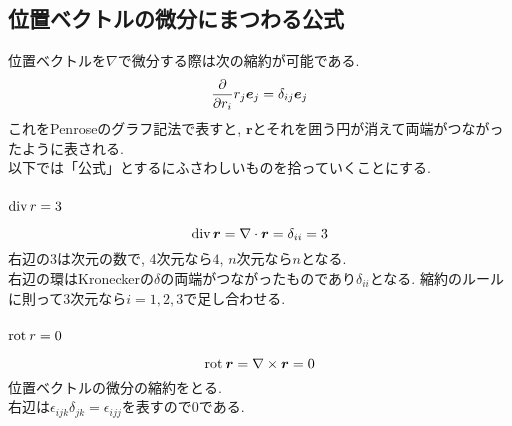 \documentclass[dvipdfmx]{jsarticle}
\begin{document}
\subsection{位置ベクトルの微分にまつわる公式}

位置ベクトルを$\nabla$で微分する際は次の縮約が可能である.
\begin{equation*}
    \pdv{r_i}r_j\bm{e}_j=\delta_{ij}\bm{e}_j
\end{equation*}
これをPenroseのグラフ記法で表すと, $\bm{r}$とそれを囲う円が消えて両端がつながったように表される.
\begin{equation*}
    
\end{equation*}
以下では「公式」とするにふさわしいものを拾っていくことにする.


\subsubsection{$\operatorname{\mathrm{div}} r=3$}

\begin{equation*}
    \operatorname{\mathrm{div}}\bm{r}=\nabla\cdot\bm{r}=\delta_{ii}=3
\end{equation*}
右辺の$3$は次元の数で, 4次元なら$4$, $n$次元なら$n$となる.
\begin{equation*}
    
\end{equation*}
右辺の環はKroneckerの$\delta$の両端がつながったものであり$\delta_{ii}$となる.
縮約のルールに則って3次元なら$i=1,2,3$で足し合わせる.


\subsubsection{$\mathrm{rot}\: r=0$}

\begin{equation*}
    \mathrm{rot}\:\bm{r}=\nabla\times\bm{r}=0
\end{equation*}
位置ベクトルの微分の縮約をとる.
\begin{equation*}
    
\end{equation*}
右辺は$\epsilon_{ijk}\delta_{jk}=\epsilon_{ijj}$を表すので$0$である.
\end{document}
